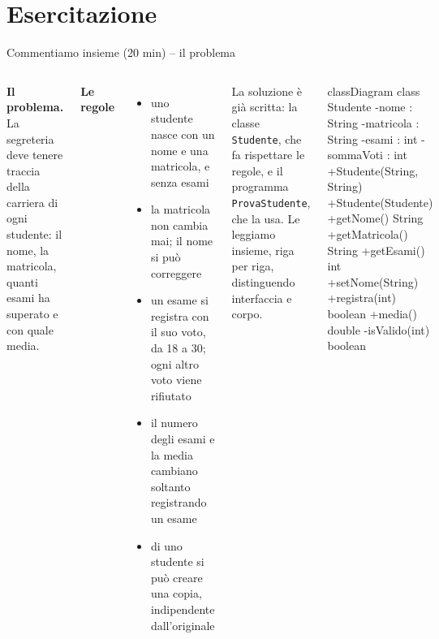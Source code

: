\documentclass[10pt,aspectratio=169]{beamer}
\begin{document}
\section{Esercitazione}

\begin{frame}[fragile]{Commentiamo insieme (20 min) -- il problema}
\begin{columns}[T]
\small
\textbf{Il problema.} La segreteria deve tenere traccia della carriera di ogni studente: il nome, la matricola, quanti esami ha superato e con quale media.

\vspace{0.2cm}
\textbf{Le regole}
\begin{itemize}\itemsep=3pt
    \item uno studente nasce con un nome e una matricola, e senza esami
    \item la matricola non cambia mai; il nome si può correggere
    \item un esame si registra con il suo voto, da 18 a 30; ogni altro voto viene rifiutato
    \item il numero degli esami e la media cambiano soltanto registrando un esame
    \item di uno studente si può creare una copia, indipendente dall'originale
\end{itemize}

\vspace{0.2cm}
La soluzione è già scritta: la classe \texttt{Studente}, che fa rispettare le regole, e il programma \texttt{ProvaStudente}, che la usa. Le leggiamo insieme, riga per riga, distinguendo interfaccia e corpo.

\begin{mermaid}
classDiagram
  class Studente {
    -nome : String
    -matricola : String
    -esami : int
    -sommaVoti : int
    +Studente(String, String)
    +Studente(Studente)
    +getNome() String
    +getMatricola() String
    +getEsami() int
    +setNome(String)
    +registra(int) boolean
    +media() double
    -isValido(int) boolean
  }
\end{mermaid}
\end{columns}
\end{frame}
\end{document}
